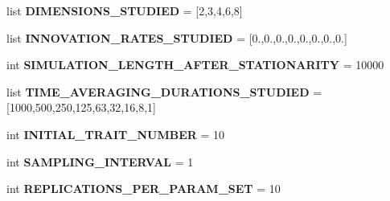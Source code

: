 \begin{DoxyCompactItemize}
\item 
\hypertarget{classctpy_1_1utils_1_1configuration_1_1_c_t_py_configuration_acfc622926aabf1367f72065dc69232ea}{list {\bfseries D\-I\-M\-E\-N\-S\-I\-O\-N\-S\-\_\-\-S\-T\-U\-D\-I\-E\-D} = \mbox{[}2,3,4,6,8\mbox{]}}\label{classctpy_1_1utils_1_1configuration_1_1_c_t_py_configuration_acfc622926aabf1367f72065dc69232ea}

\item 
\hypertarget{classctpy_1_1utils_1_1configuration_1_1_c_t_py_configuration_a09901731aea99c438ed336557fdc2708}{list {\bfseries I\-N\-N\-O\-V\-A\-T\-I\-O\-N\-\_\-\-R\-A\-T\-E\-S\-\_\-\-S\-T\-U\-D\-I\-E\-D} = \mbox{[}0.,0.,0.,0.,0.,0.,0.,0.\mbox{]}}\label{classctpy_1_1utils_1_1configuration_1_1_c_t_py_configuration_a09901731aea99c438ed336557fdc2708}

\item 
\hypertarget{classctpy_1_1utils_1_1configuration_1_1_c_t_py_configuration_a28bbeedd6c10b248b1d3615138a88be3}{int {\bfseries S\-I\-M\-U\-L\-A\-T\-I\-O\-N\-\_\-\-L\-E\-N\-G\-T\-H\-\_\-\-A\-F\-T\-E\-R\-\_\-\-S\-T\-A\-T\-I\-O\-N\-A\-R\-I\-T\-Y} = 10000}\label{classctpy_1_1utils_1_1configuration_1_1_c_t_py_configuration_a28bbeedd6c10b248b1d3615138a88be3}

\item 
\hypertarget{classctpy_1_1utils_1_1configuration_1_1_c_t_py_configuration_aae958167a9ac940a31ebd14c4cfa58c2}{list {\bfseries T\-I\-M\-E\-\_\-\-A\-V\-E\-R\-A\-G\-I\-N\-G\-\_\-\-D\-U\-R\-A\-T\-I\-O\-N\-S\-\_\-\-S\-T\-U\-D\-I\-E\-D} = \mbox{[}1000,500,250,125,63,32,16,8,1\mbox{]}}\label{classctpy_1_1utils_1_1configuration_1_1_c_t_py_configuration_aae958167a9ac940a31ebd14c4cfa58c2}

\item 
\hypertarget{classctpy_1_1utils_1_1configuration_1_1_c_t_py_configuration_ac00ba87d08ec209c61c93a8169525410}{int {\bfseries I\-N\-I\-T\-I\-A\-L\-\_\-\-T\-R\-A\-I\-T\-\_\-\-N\-U\-M\-B\-E\-R} = 10}\label{classctpy_1_1utils_1_1configuration_1_1_c_t_py_configuration_ac00ba87d08ec209c61c93a8169525410}

\item 
\hypertarget{classctpy_1_1utils_1_1configuration_1_1_c_t_py_configuration_aae400a6af08ceb075da1ba90abb2fed4}{int {\bfseries S\-A\-M\-P\-L\-I\-N\-G\-\_\-\-I\-N\-T\-E\-R\-V\-A\-L} = 1}\label{classctpy_1_1utils_1_1configuration_1_1_c_t_py_configuration_aae400a6af08ceb075da1ba90abb2fed4}

\item 
\hypertarget{classctpy_1_1utils_1_1configuration_1_1_c_t_py_configuration_a1bbcbf5c6b2e29647b64c693122fcb0b}{int {\bfseries R\-E\-P\-L\-I\-C\-A\-T\-I\-O\-N\-S\-\_\-\-P\-E\-R\-\_\-\-P\-A\-R\-A\-M\-\_\-\-S\-E\-T} = 10}\label{classctpy_1_1utils_1_1configuration_1_1_c_t_py_configuration_a1bbcbf5c6b2e29647b64c693122fcb0b}


\end{DoxyCompactItemize}
